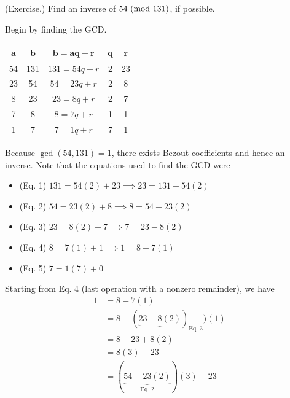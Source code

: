\documentclass[letterpaper]{article}
\begin{document}
\begin{mdframed}
    (Exercise.) Find an inverse of $54 \ (\mathrm{mod}\ 131)$, if possible. 

    \begin{mdframed}
        Begin by finding the GCD. 
        \begin{center}
            \begin{tabular}{|c|c|c|c|c|}
                \hline 
                $\mathbf{a}$ & $\mathbf{b}$ & $\mathbf{b = aq + r}$ & $\mathbf{q}$ & $\mathbf{r}$ \\ 
                \hline
                54 & 131 & $131 = 54q + r$ & 2 & 23 \\ 
                23 & 54 & $54 = 23q + r$ & 2 & 8 \\ 
                8 & 23 & $23 = 8q + r$ & 2 & 7 \\
                7 & 8 & $8 = 7q + r$ & 1 & 1 \\
                1 & 7 & $7 = 1q + r$ & 7 & 1 \\  
                \hline 
            \end{tabular}
        \end{center}
        Because $\gcd(54, 131) = 1$, there exists Bezout coefficients and hence an inverse. Note that the equations used to find the GCD were 
        \begin{itemize}
            \item (Eq. 1) $131 = 54(2) + 23 \implies 23 = 131 - 54(2)$
            \item (Eq. 2) $54 = 23(2) + 8 \implies 8 = 54 - 23(2)$ 
            \item (Eq. 3) $23 = 8(2) + 7 \implies 7 = 23 - 8(2)$
            \item (Eq. 4) $8 = 7(1) + 1 \implies 1 = 8 - 7(1)$
            \item (Eq. 5) $7 = 1(7) + 0$
        \end{itemize}
        Starting from Eq. 4 (last operation with a nonzero remainder), we have 
        \begin{equation*}
            \begin{aligned}
                1 &= 8 - 7(1) \\ 
                    &= 8 - (\underbrace{23 - 8(2)})_{\text{Eq. 3}})(1) \\ 
                    &= 8 - 23 + 8(2) \\ 
                    &= 8(3) - 23 \\ 
                    &= (\underbrace{54 - 23(2)}_{\text{Eq. 2}})(3) - 23 \\ 

\end{aligned}
\end{equation*}
\end{mdframed}
\end{mdframed}
\end{document}
